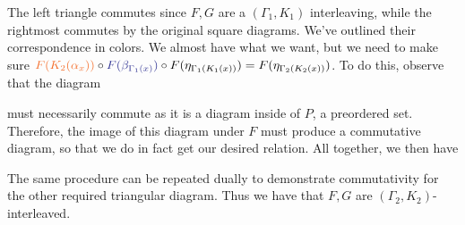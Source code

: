 \begin{prf}
\begin{center}
    \end{center}
    The left triangle commutes since $F, G$ are a $(\Gamma_1, K_1)$ interleaving, 
    while the rightmost commutes by the original square diagrams. 
    We've outlined their correspondence in colors. We almost have what we want, but 
    we need to make sure $\textcolor{Orange}{F(K_2(\alpha_x))}\circ 
    \textcolor{Blue}{F(\beta_{\Gamma_1(x)})}\circ 
    F(\eta_{\Gamma_1(K_1(x))}) = F(\eta_{\Gamma_2(K_2(x))})$. 
    To do this, observe that the diagram
    \begin{center}
    \end{center}
    must necessarily commute as it is a diagram inside of $P$, a preordered set. 
    Therefore, the image of this diagram under $F$ must produce a commutative diagram, so that we do 
    in fact get our desired relation. All together, we then have 
    \begin{center}
    \end{center}
    The same procedure can be repeated 
    dually to demonstrate commutativity for the other required triangular diagram.
    Thus we have that $F, G$ are $(\Gamma_2, K_2)$-interleaved.
\end{prf}

